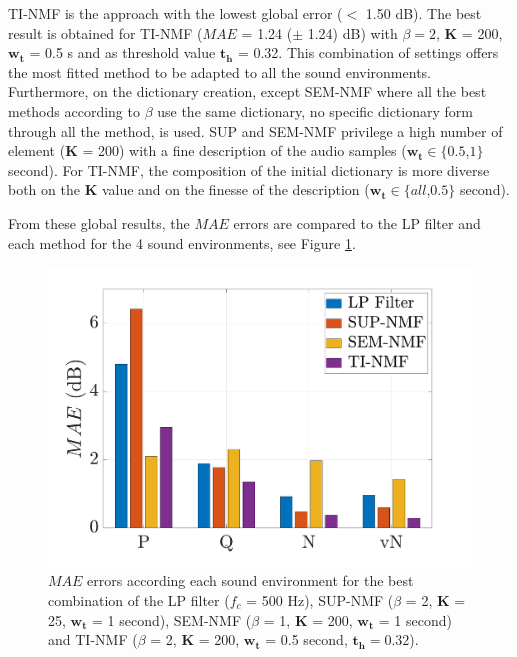 \documentclass[review,5p,twocolumn,sort&compress,times]{elsarticle}
\begin{document}
TI-NMF is the approach with the lowest global error ($<$ 1.50 dB). The best result is obtained for TI-NMF ($MAE$ = 1.24 ($\pm$ 1.24) dB) with $\beta = 2$, $\mathbf{K}$ = 200, $\mathbf{w_t}$ = 0.5 s and as threshold value $\mathbf{t_h}$ = 0.32. This combination of settings offers the most fitted method to be adapted to all the sound environments.
Furthermore, on the dictionary creation, except SEM-NMF where all the best methods according to $\beta$ use the same dictionary, no specific dictionary form through all the method, is used. SUP and SEM-NMF privilege a high number of element ($\mathbf{K}$ = 200) with a fine description of the audio samples ($\mathbf{w_t} \in \lbrace 0.5$,$1 \rbrace$ second). For TI-NMF, the composition of the initial dictionary is more diverse both on the $\mathbf{K}$ value and on the finesse  of the description ($\mathbf{w_t} \in \lbrace all$,$0.5 \rbrace$ second).

From these global results, the $MAE$ errors are compared to the LP filter and each method for the 4 sound environments, see Figure \ref{fig:mae_env}.

\begin{figure}[t]
\centering
\includegraphics[width=\linewidth]{figures/mea_grafic_bar.pdf}
\caption{$MAE$ errors according each sound environment for the best combination of the LP filter ($f_c$ = 500 Hz), SUP-NMF ($\beta$ = 2, $\mathbf{K}$ = 25, $\mathbf{w_t}$ = 1 second), SEM-NMF ($\beta$ = 1, $\mathbf{K}$ = 200, $\mathbf{w_t}$ = 1 second) and TI-NMF ($\beta$ = 2, $\mathbf{K}$ = 200, $\mathbf{w_t}$ = 0.5 second, $\mathbf{t_{h}} = 0.32$).}
\label{fig:mae_env}
\end{figure}
\end{document}
